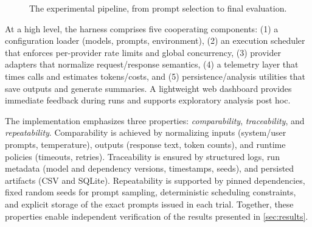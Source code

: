 \begin{figure}[h!]
\centering
{}
\caption{The experimental pipeline, from prompt selection to final evaluation.}
\label{fig:pipeline_grid}
\end{figure}



At a high level, the harness comprises five cooperating components: (1) a configuration loader (models, prompts, environment), (2) an execution scheduler that enforces per-provider rate limits and global concurrency, (3) provider adapters that normalize request/response semantics, (4) a telemetry layer that times calls and estimates tokens/costs, and (5) persistence/analysis utilities that save outputs and generate summaries. A lightweight web dashboard provides immediate feedback during runs and supports exploratory analysis post hoc.

The implementation emphasizes three properties: \textit{comparability}, \textit{traceability}, and \textit{repeatability}. Comparability is achieved by normalizing inputs (system/user prompts, temperature), outputs (response text, token counts), and runtime policies (timeouts, retries). Traceability is ensured by structured logs, run metadata (model and dependency versions, timestamps, seeds), and persisted artifacts (CSV and SQLite). Repeatability is supported by pinned dependencies, fixed random seeds for prompt sampling, deterministic scheduling constraints, and explicit storage of the exact prompts issued in each trial. Together, these properties enable independent verification of the results presented in \cref{sec:results}.

